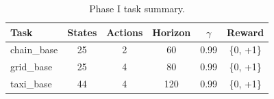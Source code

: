 \begin{table}[t]
\centering
\caption{Phase I task summary.}
\label{tab:p1a}
\begin{tabular}{lccccc}
\toprule
Task & States & Actions & Horizon & $\gamma$ & Reward \\
\midrule
  chain\_base & 25 & 2 & 60 & 0.99 & \{0, +1\} \\
  grid\_base & 25 & 4 & 80 & 0.99 & \{0, +1\} \\
  taxi\_base & 44 & 4 & 120 & 0.99 & \{0, +1\} \\
\bottomrule
\end{tabular}
\end{table}
